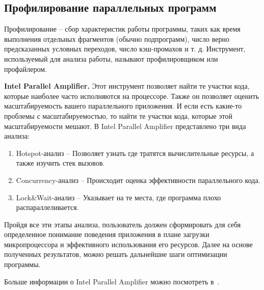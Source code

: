 \subsection{Профилирование параллельных программ}
\label{subsec:profiling-parallel-programs}

Профилирование -- сбор характеристик работы программы, таких как время выполнения отдельных фрагментов (обычно подпрограмм), число верно предсказанных условных переходов, число кэш-промахов и т. д. Инструмент, используемый для анализа работы, называют профилировщиком или профайлером.

\textbf{Intel Parallel Amplifier.} Этот инструмент позволяет найти те участки кода, которые наиболее часто исполняются на процессоре. Также он позволяет оценить масштабируемость вашего параллельного приложения. И если есть какие-то проблемы с масштабируемостью, то найти те участки кода, которые этой масштабируемости мешают. В Intel Parallel Amplifier представлено три вида анализа:

\begin{enumerate}
    \item Hotspot-анализ -- Позволяет узнать где тратятся вычислительные ресурсы, а также изучить стек вызовов.
    \item Concurrency-анализ -- Происходит оценка эффективности параллельного кода.
    \item Lock\&Wait-анализ -- Указывает на те места, где программа плохо распараллеливается.
\end{enumerate}

Пройдя все эти этапы анализа, пользователь должен сформировать для себя определенное понимание поведения приложения в плане загрузки микропроцессора и эффективного использования его ресурсов. Далее на основе полученных результатов, можно решать дальнейшие шаги оптимизации программы.

Больше информации о Intel Parallel Amplifier можно посмотреть в~\cite{IntelAmplifier}.
